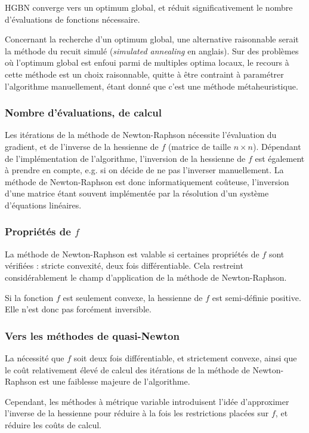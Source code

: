 \documentclass[3p, twocolumn]{elsarticle}
\begin{document}
HGBN converge vers un optimum global, et réduit significativement le nombre d'évaluations de fonctions nécessaire.

\begin{rmk}
    Concernant la recherche d'un optimum global, une alternative raisonnable serait la méthode du recuit simulé (\textit{simulated annealing} en anglais). Sur des problèmes où l'optimum global est enfoui parmi de multiples optima locaux, le recours à cette méthode est un choix raisonnable, quitte à être contraint à paramétrer l'algorithme manuellement, étant donné que c'est une méthode métaheuristique.
\end{rmk}

\subsubsection{Nombre d'évaluations, de calcul}
Les itérations de la méthode de Newton-Raphson nécessite l'évaluation du gradient, et de l'inverse de la hessienne de $f$ (matrice de taille $n\times n$). Dépendant de l'implémentation de l'algorithme, l'inversion de la hessienne de $f$ est également à prendre en compte, e.g. si on décide de ne pas l'inverser manuellement. La méthode de Newton-Raphson est donc informatiquement coûteuse, l'inversion d'une matrice étant souvent implémentée par la résolution d'un système d'équations linéaires.

\subsubsection{Propriétés de $f$}
La méthode de Newton-Raphson est valable si certaines propriétés de $f$ sont vérifiées : stricte convexité, deux fois différentiable. Cela restreint considérablement le champ d'application de la méthode de Newton-Raphson.

Si la fonction $f$ est seulement convexe, la hessienne de $f$ est semi-définie positive. Elle n'est donc pas forcément inversible.

\subsubsection{Vers les méthodes de quasi-Newton}
La nécessité que $f$ soit deux fois différentiable, et strictement convexe, ainsi que le coût relativement élevé de calcul des itérations de la méthode de Newton-Raphson est une faiblesse majeure de l'algorithme.

Cependant, les méthodes à métrique variable introduisent l'idée d'approximer l'inverse de la hessienne pour réduire à la fois les restrictions placées sur $f$, et réduire les coûts de calcul.
\end{document}
